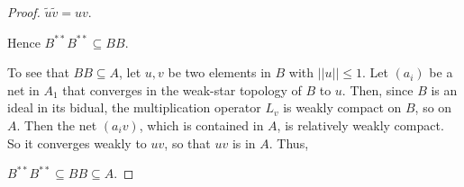 \documentclass[10pt,a4paper]{amsart}
\begin{document}
\begin{proof}
	$ \tilde{u}\tilde{v}=uv$.\vspace{2mm}
	
	\noindent Hence $ B^{**}B^{**}\subseteq BB $.\vspace{ 2mm}
	
	To see that $ BB\subseteq A $, let $ u,v $ be two elements in $ B $ with $ ||u||\leq 1 $. Let $ (a_{i}) $ be a net in $ A_{1} $ that converges in the weak-star topology of $ B $ to $ u $. Then, since $ B $ is an ideal in its bidual, the multiplication operator $ L_{v} $ is weakly compact on $ B $, so on $ A $. Then the net $ (a_{i}v) $, which is contained in $ A $, is relatively weakly compact. So it converges weakly to $ uv $, so that $ uv $ is in $ A $. Thus,\vspace{2mm}
	
	$ B^{**}B^{**}\subseteq BB\subseteq A $.
	\end{proof}
\end{document}
